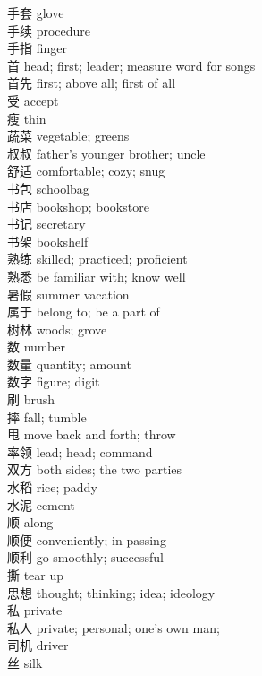 手套 \quad glove\\
手续 \quad procedure\\
手指 \quad finger\\
首 \quad head; first; leader; measure word for songs\\
首先 \quad first; above all; first of all\\
受 \quad accept\\
瘦 \quad thin\\
蔬菜 \quad vegetable; greens\\
叔叔 \quad father's younger brother; uncle\\
舒适 \quad comfortable; cozy; snug\\
书包 \quad schoolbag\\
书店 \quad bookshop; bookstore\\
书记 \quad secretary\\
书架 \quad bookshelf\\
熟练 \quad skilled; practiced; proficient\\
熟悉 \quad be familiar with; know well\\
暑假 \quad summer vacation\\
属于 \quad belong to; be a part of\\
树林 \quad woods; grove\\
数 \quad number\\
数量 \quad quantity; amount\\
数字 \quad figure; digit\\
刷 \quad brush\\
摔 \quad fall; tumble\\
甩 \quad move back and forth; throw\\
率领 \quad lead; head; command\\
双方 \quad both sides; the two parties\\
水稻 \quad rice; paddy\\
水泥 \quad cement\\
顺 \quad along\\
顺便 \quad conveniently; in passing\\
顺利 \quad go smoothly; successful\\
撕 \quad tear up\\
思想 \quad thought; thinking; idea; ideology\\
私 \quad private\\
私人 \quad private; personal; one's own man;\\
司机 \quad driver\\
丝 \quad silk\\
